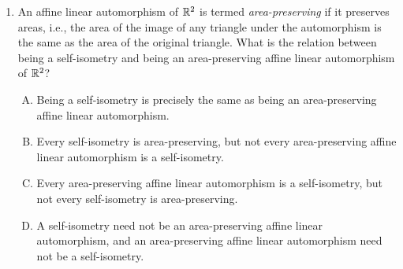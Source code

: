 \documentclass[10pt]{amsart}
\begin{document}
\begin{enumerate}
   \begin{enumerate}[(A)]
   \item It must be a rotation with the same center of rotation but
     with a different angle of rotation.
   \item It must be a rotation with the same angle of rotation but with a
     different center of rotation.
  \item It must be a reflection about a line passing through the
    center of rotation.
  \item It must be a reflection about a line {\em not} passing through
    the center of rotation.
  \item It must be a translation.
  \end{enumerate}

  {\em Answer}: Option (B)

  {\em Explanation}: The angle of rotation must remain the same. We
  can see this by imagining some kind of physical figure that is made
  to undergo the rotation and then the translation. The rotation
  changes the direction of the figure by the angle of rotation. The
  translation then preserves the direction of the figure. The
  composite should also change the direction of the figure by the same
  angle, hence must be a rotation by the same angle. The center of
  rotation may well be different, and in fact, must be different if
  the translation is nontrivial.

  {\em Performance review}: 17 out of 27 got this. 3 each chose
  (A) and (E), 2 chose (D), 1 chose (C), 1 left the question blank.

  {\em Historical note (last time)}: $16$ out of $27$ got this. $7$ chose (A),
  $2$ chose (C), $1$ each chose (D) and (E).
\item An affine linear automorphism of $\mathbb{R}^2$ is termed {\em
  area-preserving} if it preserves areas, i.e., the area of the image
  of any triangle under the automorphism is the same as the area of
  the original triangle. What is the relation between being a
  self-isometry and being an area-preserving affine linear
  automorphism of $\mathbb{R}^2$?

  \begin{enumerate}[(A)]
  \item Being a self-isometry is precisely the same as being an
    area-preserving affine linear automorphism.
  \item Every self-isometry is area-preserving, but not every
    area-preserving affine linear automorphism is a self-isometry.
  \item Every area-preserving affine linear automorphism is a
    self-isometry, but not every self-isometry is area-preserving.
  \item A self-isometry need not be an area-preserving affine linear
    automorphism, and an area-preserving affine linear automorphism
    need not be a self-isometry.
  \end{enumerate}


\end{enumerate}
\end{document}
